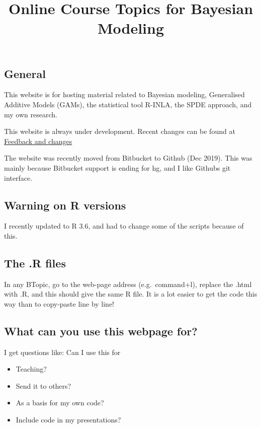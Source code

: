 \documentclass[]{article}
\title{Online Course Topics for Bayesian Modeling}
\author{}
\date{\vspace{-2.5em}}
\providecommand{\tightlist}{%
  \setlength{\itemsep}{0pt}\setlength{\parskip}{0pt}}
\begin{document}
\maketitle

\hypertarget{general}{%
\subsection{General}\label{general}}

This website is for hosting material related to Bayesian modeling,
Generalised Additive Models (GAMs), the statistical tool R-INLA, the
SPDE approach, and my own research.

This website is always under development. Recent changes can be found at
\href{./feedback.html}{Feedback and changes}

The website was recently moved from Bitbucket to Github (Dec 2019). This
was mainly because Bitbucket support is ending for hg, and I like
Githubs git interface.

\hypertarget{warning-on-r-versions}{%
\subsection{Warning on R versions}\label{warning-on-r-versions}}

I recently updated to R 3.6, and had to change some of the scripts
because of this.

\hypertarget{the-.r-files}{%
\subsection{The .R files}\label{the-.r-files}}

In any BTopic, go to the web-page address (e.g.~command+l), replace the
.html with .R, and this should give the same R file. It is a lot easier
to get the code this way than to copy-paste line by line!

\hypertarget{what-can-you-use-this-webpage-for}{%
\subsection{What can you use this webpage
for?}\label{what-can-you-use-this-webpage-for}}

I get questions like: Can I use this for

\begin{itemize}
\tightlist
\item
  Teaching?
\item
  Send it to others?
\item
  As a basis for my own code?
\item
  Include code in my presentations?
\end{itemize}
\end{document}
